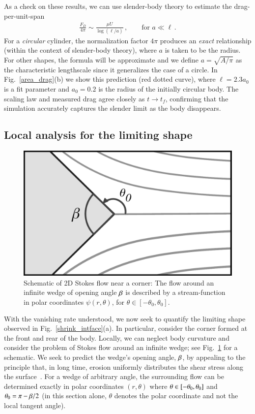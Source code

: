 \documentclass[preprint, 10pt]{elsarticle}
\begin{document}
As a check on these results, we can use slender-body theory to estimate the drag-per-unit-span
\begin{align}
\label{dragscaling}
\frac{F_D}{4 \pi} \sim \frac{ \mu U}{\log(\ell/a)}\, ,	\qquad \text{for } a \ll \ell \, .
\end{align}
For a {\em circular} cylinder, the normalization factor $4 \pi$ produces an {\em exact} relationship (within the context of slender-body theory), where $a$ is taken to be the radius. For other shapes, the formula will be approximate and we define $a = \sqrt{A/\pi}$ as the characteristic lengthscale since it generalizes the case of a circle. In Fig.~\ref{area_drag}(b) we show this prediction (red dotted curve), where $\ell = 2.3 a_0$ is a fit parameter and $a_0 = 0.2$ is the radius of the initially circular body. The scaling law and measured drag agree closely as $t \to t_f$, confirming that the simulation accurately captures the slender limit as the body disappears.


\subsection{Local analysis for the limiting shape}
\label{LimitingShape}
 
\begin{figure}%
\begin{center}
\includegraphics[width = 0.4 \textwidth]{./figs/corner.pdf}
\caption{Schematic of 2D Stokes flow near a corner: The flow around an infinite wedge of opening angle $\beta$ is described by a stream-function in polar coordinates $\psi(r,\theta)$, for $\theta \in [-\theta_0, \theta_0]$.}
\label{corner}
\end{center}
\end{figure}
 
With the vanishing rate understood, we now seek to quantify the limiting shape observed in Fig.~\ref{shrink_intface}(a). In particular, consider the corner formed at the front and rear of the body. Locally, we can neglect body curvature and consider the problem of Stokes flow around an infinite wedge; see Fig.~\ref{corner} for a schematic. We seek to predict the wedge's opening angle, $\beta$, by appealing to the principle that, in long time, erosion uniformly distributes the shear stress along the surface~\cite{moo-ris-chi-zha-she2013, moore2017riemann}. For a wedge of arbitrary angle, the surrounding flow can be determined exactly in polar coordinates $(r, \theta)$ where $\theta \in [-\theta_0,\theta_0]$ and $\theta_0 = \pi - \beta/2$ (in this section alone, $\theta$ denotes the polar coordinate and not the local tangent angle). 
\end{document}
